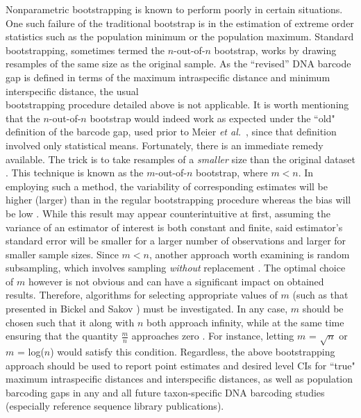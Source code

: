 Nonparametric bootstrapping is known to perform poorly in certain situations. One such failure of the traditional bootstrap is in the estimation of extreme order statistics such as the population minimum or the population maximum. Standard bootstrapping, sometimes termed the $n$-out-of-$n$ bootstrap, works by drawing resamples of the same size as the original sample. As the ``revised'' DNA barcode gap is defined in terms of the maximum intraspecific distance and minimum interspecific distance, the usual \\ bootstrapping procedure detailed above is not applicable. It is worth mentioning that the $n$-out-of-$n$ bootstrap would indeed work as expected under the ``old" definition of the barcode gap, used prior to Meier \textit{et al.}~\cite{meier2008use}, since that definition involved only statistical means. Fortunately, there is an immediate remedy available. The trick is to take resamples of a \textit{smaller} size than the original dataset \cite{bickel1997resampling}. This technique is known as the $m$-out-of-$n$ bootstrap, where $m < n$. In employing such a method, the variability of corresponding estimates will be higher (larger) than in the regular bootstrapping procedure whereas the bias will be low \cite{chernick2007bootstrap, chernick2011bootstrap}. While this result may appear counterintuitive at first, assuming the variance of an estimator of interest is both constant and finite, said estimator's standard error will be smaller for a larger number of observations and larger for smaller sample sizes. Since $m < n$, another approach worth examining is random subsampling, which involves sampling \textit{without} replacement \cite{politis1999subsampling}. The optimal choice of $m$ however is not obvious and can have a significant impact on obtained results. Therefore, algorithms for selecting appropriate values of $m$ (such as that presented in Bickel and Sakov \cite{bickel2008choice}) must be investigated. In any case, $m$ should be chosen such that it along with $n$ both approach infinity, while at the same time ensuring that the quantity $\frac{m}{n}$ approaches zero \cite{chernick2007bootstrap, chernick2011bootstrap}. For instance, letting $m$ = $\sqrt{n}$ or $m$ = log($n$) would satisfy this condition. Regardless, the above bootstrapping approach should be used to report point estimates and desired level CIs for ``true" maximum intraspecific distances and interspecific distances, as well as population barcoding gaps in any and all future taxon-specific DNA barcoding studies (especially reference sequence library publications).



